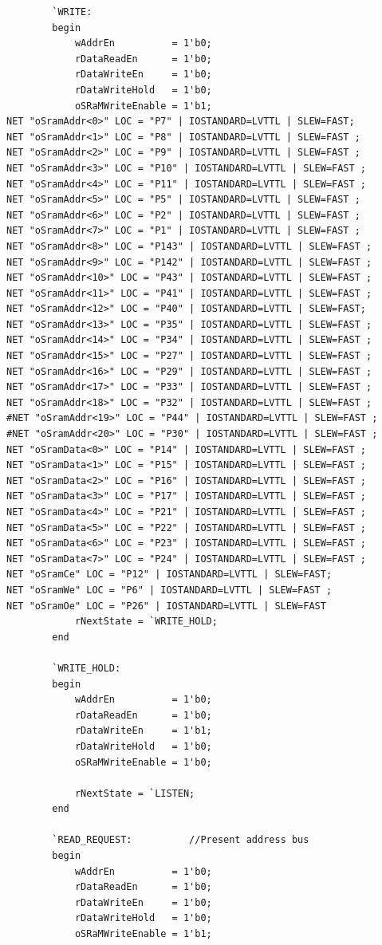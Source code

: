 \documentclass[10pt]{article}
\begin{document}
\begin{lstlisting}
		`WRITE:
		begin
			wAddrEn          = 1'b0;
			rDataReadEn      = 1'b0;
			rDataWriteEn     = 1'b0;
			rDataWriteHold   = 1'b0;
			oSRaMWriteEnable = 1'b1;
NET "oSramAddr<0>" LOC = "P7" | IOSTANDARD=LVTTL | SLEW=FAST;
NET "oSramAddr<1>" LOC = "P8" | IOSTANDARD=LVTTL | SLEW=FAST ;
NET "oSramAddr<2>" LOC = "P9" | IOSTANDARD=LVTTL | SLEW=FAST ;
NET "oSramAddr<3>" LOC = "P10" | IOSTANDARD=LVTTL | SLEW=FAST ;
NET "oSramAddr<4>" LOC = "P11" | IOSTANDARD=LVTTL | SLEW=FAST ;
NET "oSramAddr<5>" LOC = "P5" | IOSTANDARD=LVTTL | SLEW=FAST ;
NET "oSramAddr<6>" LOC = "P2" | IOSTANDARD=LVTTL | SLEW=FAST ;
NET "oSramAddr<7>" LOC = "P1" | IOSTANDARD=LVTTL | SLEW=FAST ;
NET "oSramAddr<8>" LOC = "P143" | IOSTANDARD=LVTTL | SLEW=FAST ;
NET "oSramAddr<9>" LOC = "P142" | IOSTANDARD=LVTTL | SLEW=FAST ;
NET "oSramAddr<10>" LOC = "P43" | IOSTANDARD=LVTTL | SLEW=FAST ;
NET "oSramAddr<11>" LOC = "P41" | IOSTANDARD=LVTTL | SLEW=FAST ;
NET "oSramAddr<12>" LOC = "P40" | IOSTANDARD=LVTTL | SLEW=FAST;
NET "oSramAddr<13>" LOC = "P35" | IOSTANDARD=LVTTL | SLEW=FAST ;
NET "oSramAddr<14>" LOC = "P34" | IOSTANDARD=LVTTL | SLEW=FAST ;
NET "oSramAddr<15>" LOC = "P27" | IOSTANDARD=LVTTL | SLEW=FAST ;
NET "oSramAddr<16>" LOC = "P29" | IOSTANDARD=LVTTL | SLEW=FAST ;
NET "oSramAddr<17>" LOC = "P33" | IOSTANDARD=LVTTL | SLEW=FAST ;
NET "oSramAddr<18>" LOC = "P32" | IOSTANDARD=LVTTL | SLEW=FAST ;
#NET "oSramAddr<19>" LOC = "P44" | IOSTANDARD=LVTTL | SLEW=FAST ;
#NET "oSramAddr<20>" LOC = "P30" | IOSTANDARD=LVTTL | SLEW=FAST ;
NET "oSramData<0>" LOC = "P14" | IOSTANDARD=LVTTL | SLEW=FAST ;
NET "oSramData<1>" LOC = "P15" | IOSTANDARD=LVTTL | SLEW=FAST ;
NET "oSramData<2>" LOC = "P16" | IOSTANDARD=LVTTL | SLEW=FAST ;
NET "oSramData<3>" LOC = "P17" | IOSTANDARD=LVTTL | SLEW=FAST ;
NET "oSramData<4>" LOC = "P21" | IOSTANDARD=LVTTL | SLEW=FAST ;
NET "oSramData<5>" LOC = "P22" | IOSTANDARD=LVTTL | SLEW=FAST ;
NET "oSramData<6>" LOC = "P23" | IOSTANDARD=LVTTL | SLEW=FAST ;
NET "oSramData<7>" LOC = "P24" | IOSTANDARD=LVTTL | SLEW=FAST ;
NET "oSramCe" LOC = "P12" | IOSTANDARD=LVTTL | SLEW=FAST;
NET "oSramWe" LOC = "P6" | IOSTANDARD=LVTTL | SLEW=FAST ;
NET "oSramOe" LOC = "P26" | IOSTANDARD=LVTTL | SLEW=FAST
			rNextState = `WRITE_HOLD;
		end

		`WRITE_HOLD:
		begin
			wAddrEn          = 1'b0;
			rDataReadEn      = 1'b0;
			rDataWriteEn     = 1'b1;
			rDataWriteHold   = 1'b0;
			oSRaMWriteEnable = 1'b0;

			rNextState = `LISTEN;
		end

		`READ_REQUEST:			//Present address bus
		begin	
			wAddrEn          = 1'b0;
			rDataReadEn      = 1'b0;
			rDataWriteEn     = 1'b0;
			rDataWriteHold   = 1'b0;
			oSRaMWriteEnable = 1'b1;


\end{lstlisting}
\end{document}
